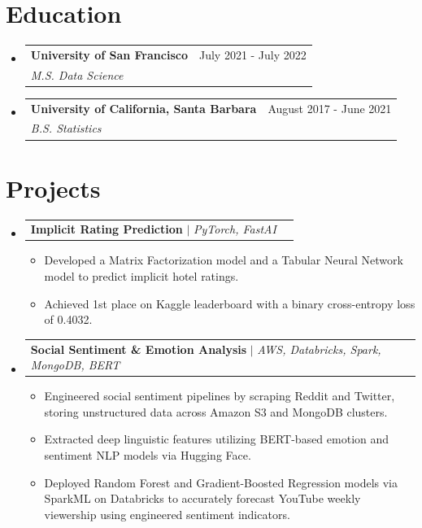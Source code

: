 \documentclass[letterpaper,11pt]{article}
\makeatletter
\newcommand{\resumeItem}[1]{
  \item\small{
    {#1 \vspace{-2pt}}
  }
}
\newcommand{\resumeSubheading}[4]{
  \vspace{-2pt}\item
    \begin{tabular*}{0.97\textwidth}[t]{l@{\extracolsep{\fill}}r}
      \textbf{#1} & #2 \\
      \textit{\small#3} & \textit{\small #4} \\
    \end{tabular*}\vspace{-8pt}
}
\newcommand{\resumeProjectHeading}[2]{
    \item
    \begin{tabular*}{0.97\textwidth}{l@{\extracolsep{\fill}}r}
      \small#1 & #2 \\
    \end{tabular*}\vspace{-5pt}
}
\newcommand{\resumeSubHeadingListStart}{\begin{itemize}[leftmargin=0.15in, label={}]}
\newcommand{\resumeSubHeadingListEnd}{\end{itemize}}
\newcommand{\resumeItemListStart}{\begin{itemize}}
\newcommand{\resumeItemListEnd}{\end{itemize}\vspace{-5pt}}
\makeatother
\begin{document}
\section{Education}
  \resumeSubHeadingListStart
    \resumeSubheading
      {University of San Francisco}{July 2021 - July 2022}
      {M.S. Data Science}{}
      
    \resumeSubheading
      {University of California, Santa Barbara}{August 2017 - June 2021}
      {B.S. Statistics}{}
  \resumeSubHeadingListEnd

\section{Projects}
    \resumeSubHeadingListStart
      \resumeProjectHeading
          {\textbf{Implicit Rating Prediction} $|$ \emph{PyTorch, FastAI}}{}
          \resumeItemListStart
            \resumeItem{Developed a Matrix Factorization model and a Tabular Neural Network model to predict implicit hotel ratings.}
            \resumeItem{Achieved 1st place on Kaggle leaderboard with a binary cross-entropy loss of 0.4032.}
          \resumeItemListEnd
      \resumeProjectHeading
          {\textbf{Social Sentiment \& Emotion Analysis} $|$ \emph{AWS, Databricks, Spark, MongoDB, BERT}}{}
          \resumeItemListStart
            \resumeItem{Engineered social sentiment pipelines by scraping Reddit and Twitter, storing unstructured data across Amazon S3 and MongoDB clusters.}
            \resumeItem{Extracted deep linguistic features utilizing BERT-based emotion and sentiment NLP models via Hugging Face.}
            \resumeItem{Deployed Random Forest and Gradient-Boosted Regression models via SparkML on Databricks to accurately forecast YouTube weekly viewership using engineered sentiment indicators.}
          \resumeItemListEnd
    \resumeSubHeadingListEnd
\end{document}
